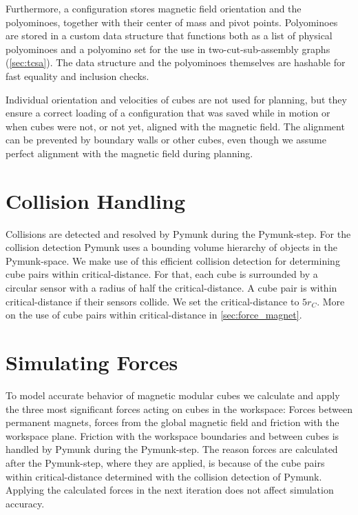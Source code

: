 Furthermore, a configuration stores magnetic field orientation and the polyominoes, together with their center of mass and pivot points.
Polyominoes are stored in a custom data structure that functions both as a list of physical polyominoes and a polyomino set for the use in two-cut-sub-assembly graphs (\autoref{sec:tcsa}).
The data structure and the polyominoes themselves are hashable for fast equality and inclusion checks.

Individual orientation and velocities of cubes are not used for planning, but they ensure a correct loading of a configuration that was saved while in motion or when cubes were not, or not yet, aligned with the magnetic field.
The alignment can be prevented by boundary walls or other cubes, even though we assume perfect alignment with the magnetic field during planning.


\section{Collision Handling}
\label{sec:coll_handling}

Collisions are detected and resolved by Pymunk during the Pymunk-step.
For the collision detection Pymunk uses a bounding volume hierarchy of objects in the Pymunk-space.
We make use of this efficient collision detection for determining cube pairs within critical-distance.
For that, each cube is surrounded by a circular sensor with a radius of half the critical-distance.
A cube pair is within critical-distance if their sensors collide.
We set the critical-distance to $5 r_C$.
More on the use of cube pairs within critical-distance in \autoref{sec:force_magnet}.

\section{Simulating Forces}

To model accurate behavior of magnetic modular cubes we calculate and apply the three most significant forces acting on cubes in the workspace:
Forces between permanent magnets, forces from the global magnetic field and friction with the workspace plane.
Friction with the workspace boundaries and between cubes is handled by Pymunk during the Pymunk-step.
The reason forces are calculated after the Pymunk-step, where they are applied, is because of the cube pairs within critical-distance determined with the collision detection of Pymunk.
Applying the calculated forces in the next iteration does not affect simulation accuracy.

